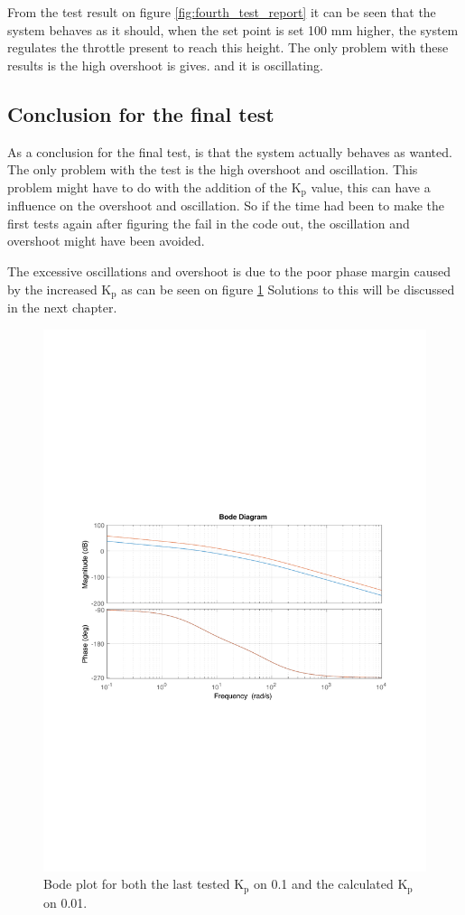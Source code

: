From the test result on figure \ref{fig:fourth_test_report} it can be seen that the system behaves as it should, when the set point is set 100 mm higher, the system regulates the throttle present to reach this height. The only problem with these results is the high overshoot is gives. and it is oscillating.

\subsection*{Conclusion for the final test}
As a conclusion for the final test, is that the system actually behaves as wanted. The only problem with the test is the high overshoot and oscillation. This problem might have to do with the addition of the K$_\text{p}$ value, this can have a influence on the overshoot and oscillation. So if the time had been to make the first tests again after figuring the fail in the code out, the oscillation and overshoot might have been avoided.

 The excessive oscillations and overshoot is due to the poor phase margin caused by the increased K$_\text{p}$ as can be seen on figure \ref{fig:bodeplot_final} Solutions to this will be discussed in the next chapter.

\begin{figure}[H]
    \centering
    \includegraphics[width=\textwidth]{figures/Appendix/final_test/bodeplot_final.pdf}
    \caption{Bode plot for both the last tested K$_\text{p}$ on 0.1 and the calculated K$_\text{p}$ on 0.01.}
    \label{fig:bodeplot_final}
\end{figure}